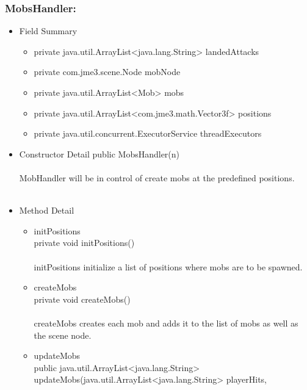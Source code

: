 \documentclass[letterpaper]{article}
\begin{document}
								\vspace{0.2in}
								\subsubsection*{MobsHandler:}
								\vspace{0.1in}
									\begin{itemize}
										\item	Field Summary
												\begin{itemize}
													\item	private java.util.ArrayList<java.lang.String>	landedAttacks 
													\item	private com.jme3.scene.Node	mobNode 
													\item	private java.util.ArrayList<Mob>	mobs 
													\item	private java.util.ArrayList<com.jme3.math.Vector3f>	positions 
													\item	private java.util.concurrent.ExecutorService	threadExecutors 
												\end{itemize}
										\item	Constructor Detail
												public MobsHandler(n) \\ \\
												MobHandler will be in control of create mobs at the predefined positions. \\ \\
										\item	Method Detail
												\begin{itemize}
													\item	initPositions \\
															private void initPositions() \\ \\
															initPositions initialize a list of positions where mobs are to be spawned.
													\item	createMobs \\
															private void createMobs() \\ \\
															createMobs creates each mob and adds it to the list of mobs as well as the scene node. \\
													\item	updateMobs \\
															public java.util.ArrayList<java.lang.String> updateMobs(java.util.ArrayList<java.lang.String> playerHits,

\end{itemize}
\end{itemize}
\end{document}
